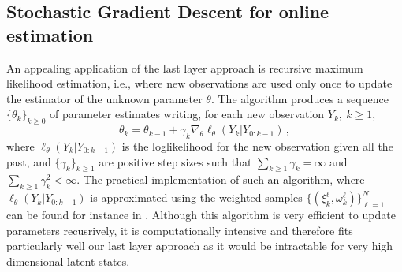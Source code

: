 \documentclass{article}
\begin{document}

\subsection{Stochastic Gradient Descent for online estimation}
An appealing application of the last layer approach is recursive maximum likelihood estimation, i.e., where new observations are used only once to update the estimator of the unknown parameter $\theta$. The algorithm produces a sequence $\lbrace\theta_k\rbrace_{k\geq 0}$ of parameter estimates writing, for each new observation $Y_{k},~k\geq 1$,
$$
	\theta_{k} = \theta_{k-1} + \gamma_k \nabla_\theta \ell_{\theta}(Y_k | Y_{0:k - 1}) \,,
$$
where $\ell_{\theta}(Y_k | Y_{0:k - 1})$ is the loglikelihood for the new observation given all the past, and $\lbrace\gamma_k\rbrace_{k\geq 1}$ are positive step sizes such that $\sum_{k \geq 1}\gamma_k = \infty$ and $\sum_{k \geq 1}\gamma_k^2 < \infty$. The practical implementation of such an algorithm, where $\ell_{\theta}(Y_k | Y_{0:k - 1})$ is approximated using the weighted samples $\{(\xi^{\ell}_k,\omega^{\ell}_k)\}_{\ell=1}^N$ can be found for instance in \cite{}. Although this algorithm is very efficient to update parameters recusrively, it is computationally intensive and therefore fits particularly well our last layer approach as it would be intractable for very high dimensional latent states.
\end{document}
